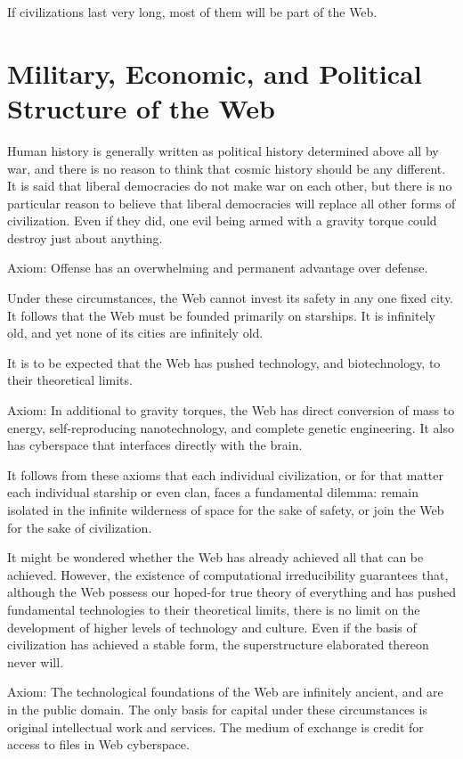 \documentclass[english,11pt,letterpaper,onecolumn]{scrbook}
\begin{document}
If civilizations last very long, most of them will be part of the Web.

\section{Military, Economic, and Political Structure of the Web}

Human history is generally written as political history determined above all by war, and there is no reason to think that cosmic history should be any different.  It is said that liberal democracies do not make war on each other, but there is no particular reason to believe that liberal democracies will replace all other forms of civilization.  Even if they did, one evil being armed with a gravity torque could destroy just about anything.

Axiom:	Offense has an overwhelming and permanent advantage over defense.

Under these circumstances, the Web cannot invest its safety in any one fixed city.  It follows that the Web must be founded primarily on starships.  It is infinitely old, and yet none of its cities are infinitely old.

It is to be expected that the Web has pushed technology, and biotechnology, to their theoretical limits.

Axiom:	In additional to gravity torques, the Web has direct conversion of mass to energy, self-reproducing nanotechnology, and complete genetic engineering.  It also has cyberspace that interfaces directly with the brain.

It follows from these axioms that each individual civilization, or for that matter each individual starship or even clan, faces a fundamental dilemma:  remain isolated in the infinite wilderness of space for the sake of safety, or join the Web for the sake of civilization.

It might be wondered whether the Web has already achieved all that can be achieved.  However, the existence of computational irreducibility guarantees that, although the Web possess our hoped-for true theory of everything and has pushed fundamental technologies to their theoretical limits, there is no limit on the development of higher levels of technology and culture.  Even if the basis of civilization has achieved a stable form, the superstructure elaborated thereon never will.

Axiom:	The technological foundations of the Web are infinitely ancient, and are in the public domain.  The only basis for capital under these circumstances is original intellectual work and services.  The medium of exchange is credit for access to files in Web cyberspace.
\end{document}
